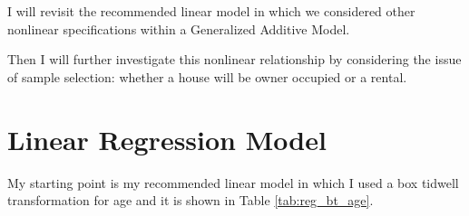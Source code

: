 %
%
%
%
%
%
%
%
%
%
%
%
%
%
%

I will revisit the recommended linear model in which we
considered other nonlinear specifications
within a Generalized Additive Model. 

Then I will further investigate this nonlinear relationship
by considering the issue of sample selection:
whether a house will be owner occupied or a rental.


\clearpage
\section{Linear Regression Model}

My starting point is my recommended linear model
in which I used a box tidwell transformation for age and it is shown in Table \ref{tab:reg_bt_age}.

